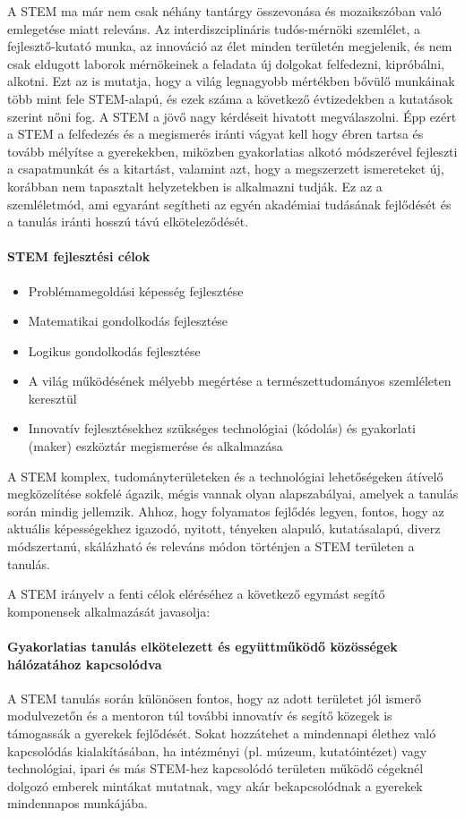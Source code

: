 A STEM ma már nem csak néhány tantárgy összevonása és  mozaikszóban való emlegetése miatt releváns. Az interdiszciplináris tudós-mér\-nö\-ki szemlélet, a fejlesztő-kutató munka, az innováció az élet minden területén megjelenik, és nem csak eldugott laborok mérnökeinek a feladata új dolgokat felfedezni, kipróbálni, alkotni. Ezt az is mutatja, hogy a világ legnagyobb mértékben bővülő munkáinak több mint fele STEM-alapú, és ezek száma a következő évtizedekben a kutatások szerint nőni fog. A STEM a jövő nagy kérdéseit hivatott megválaszolni. Épp ezért a STEM a felfedezés és a megismerés iránti vágyat kell hogy ébren tartsa és tovább mélyítse a gyerekekben, miközben gyakorlatias alkotó módszerével fejleszti a csapatmunkát és a kitartást, valamint azt, hogy a megszerzett ismereteket új, korábban nem tapasztalt helyzetekben is alkalmazni tudják. Ez az a szemléletmód, ami egyaránt segítheti az egyén akadémiai tudásának fejlődését és a tanulás iránti hosszú távú elköteleződését.

\paragraph{STEM fejlesztési célok}
\begin{itemize}
  \item Problémamegoldási képesség fejlesztése
  \item  Matematikai gondolkodás fejlesztése
  \item  Logikus gondolkodás fejlesztése
  \item  A világ működésének mélyebb megértése a természettudományos szemléleten keresztül
  \item  Innovatív fejlesztésekhez szükséges technológiai (kódolás) és gyakorlati (maker) eszköztár megismerése és alkalmazása
\end{itemize}

A STEM komplex, tudományterületeken és a technológiai lehetőségeken átívelő megközelítése sokfelé ágazik, mégis vannak olyan alapszabályai, amelyek a tanulás során mindig jellemzik. Ahhoz, hogy folyamatos fejlődés legyen, fontos, hogy az aktuális képességekhez igazodó, nyitott, tényeken alapuló, kutatásalapú, diverz módszertanú, skálázható és releváns módon történjen a STEM területen a tanulás.

A STEM irányelv a fenti célok eléréséhez a következő egymást segítő komponensek alkalmazását javasolja:
\paragraph{Gyakorlatias tanulás elkötelezett és együttműködő
  közösségek hálózatához
  kapcsolódva}
A STEM tanulás során különösen fontos, hogy az adott területet jól ismerő modulvezetőn és a mentoron túl további innovatív és segítő közegek is támogassák a gyerekek fejlődését. Sokat hozzátehet a mindennapi élethez való kapcsolódás kialakításában, ha intézményi (pl. múzeum, kutatóintézet) vagy technológiai, ipari és más STEM-hez kapcsolódó területen működő cégeknél dolgozó emberek mintákat mutatnak, vagy akár bekapcsolódnak a gyerekek mindennapos munkájába.

